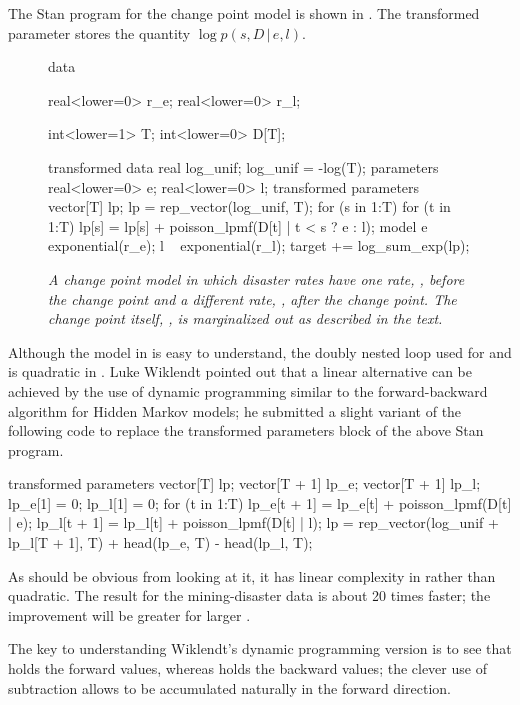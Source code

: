The Stan program for the change point model is shown in
.  The transformed parameter
 stores the quantity $\log p(s, D \, | \, e, l)$.
%
\begin{figure}
\begin{stancode}
data {
  real<lower=0> r_e;
  real<lower=0> r_l;

  int<lower=1> T;
  int<lower=0> D[T];
}
transformed data {
  real log_unif;
  log_unif = -log(T);
}
parameters {
  real<lower=0> e;
  real<lower=0> l;
}
transformed parameters {
  vector[T] lp;
  lp = rep_vector(log_unif, T);
  for (s in 1:T)
    for (t in 1:T)
      lp[s] = lp[s] + poisson_lpmf(D[t] | t < s ? e : l);
}
model {
  e ~ exponential(r_e);
  l ~ exponential(r_l);
  target += log_sum_exp(lp);
}
\end{stancode}
\vspace*{-6pt}
\caption{\small\it A change point model in which disaster rates
   have one rate, , before the change point and a
  different rate, , after the change point.  The change point
  itself, , is marginalized out as described in the
  text.}\label{change-point-model.figure}
\end{figure}

Although the model in  is easy to
understand, the doubly nested loop used for  and  is
quadratic in .  Luke Wiklendt pointed out that a linear
alternative can be achieved by the use of dynamic programming similar
to the forward-backward algorithm for Hidden Markov models;  he
submitted a slight variant of the following code to replace the
transformed parameters block of the above Stan program.
%
\begin{stancode}
transformed parameters {
    vector[T] lp;
    {
      vector[T + 1] lp_e;
      vector[T + 1] lp_l;
      lp_e[1] = 0;
      lp_l[1] = 0;
      for (t in 1:T) {
        lp_e[t + 1] = lp_e[t] + poisson_lpmf(D[t] | e);
        lp_l[t + 1] = lp_l[t] + poisson_lpmf(D[t] | l);
      }
      lp = rep_vector(log_unif + lp_l[T + 1], T)
           + head(lp_e, T) - head(lp_l, T);
    }
  }
\end{stancode}
%
As should be obvious from looking at it, it has linear complexity in
 rather than quadratic.  The result for the mining-disaster
data is about 20 times faster;  the improvement will be greater for
larger .

The key to understanding Wiklendt's dynamic programming version is to
see that  holds the forward values, whereas
 holds the backward values; the
clever use of subtraction allows  to be accumulated
naturally in the forward direction.


